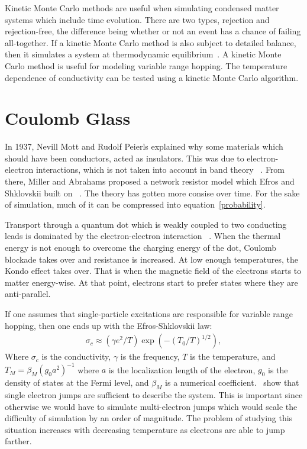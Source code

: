 Kinetic Monte Carlo methods are useful when simulating condensed matter systems which include time evolution. There are two types, rejection and rejection-free, the difference being whether or not an event has a chance of failing all-together. If a kinetic Monte Carlo method is also subject to detailed balance, then it simulates a system at thermodynamic equilibrium~\cite{Young66}. A kinetic Monte Carlo method is useful for modeling variable range hopping. The temperature dependence of conductivity can be tested using a kinetic Monte Carlo algorithm.

\section{Coulomb Glass}
In 1937, Nevill Mott and Rudolf Peierls explained why some materials which should have been conductors, acted as insulators. This was due to electron-electron interactions, which is not taken into account in band theory ~\cite{mott72}. From there, Miller and Abrahams proposed a network resistor model which Efros and Shklovskii built on ~\cite{efros75}. The theory has gotten more consise over time. For the sake of simulation, much of it can be compressed into equation~\ref{probability}.

Transport through a quantum dot which is weakly coupled to two conducting leads is dominated by the electron-electron interaction ~\cite{Glazman05}. When the thermal energy is not enough to overcome the charging energy of the dot, Coulomb blockade takes over and resistance is increased. At low enough temperatures, the Kondo effect takes over. That is when the magnetic field of the electrons starts to matter energy-wise. At that point, electrons start to prefer states where they are anti-parallel.

If one assumes that single-particle excitations are responsible for variable range hopping, then one ends up with the Efros-Shklovskii law:
\begin{eqnarray}
\sigma_c \approx (\gamma e^2 / T) \exp(-(T_0/T)^{1/2}),
\label{ESlaw }
\end{eqnarray}
Where $\sigma_c$ is the conductivity, $\gamma$ is the frequency, $T$ is the temperature, and $T_M = \beta_M (g_0 a^2)^{-1}$ where $a$ is the localization length of the electron, $g_0$ is the density of states at the Fermi level, and $\beta_M$ is a numerical coefficient.~\cite{Tsigankov02} show that single electron jumps are sufficient to describe the system. This is important since otherwise we would have to simulate multi-electron jumps which would scale the difficulty of simulation by an order of magnitude. The problem of studying this situation increases with decreasing temperature as electrons are able to jump farther. 

